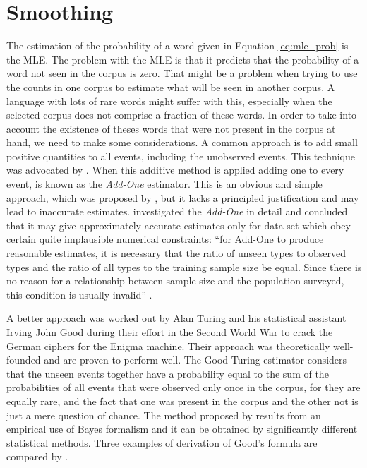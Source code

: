\section{Smoothing}
The estimation of the probability of a word given in Equation \ref{eq:mle_prob} is the MLE.
The problem with the MLE is that it predicts that the probability of a word not seen in the corpus
is zero. That might be a problem when trying to use the counts in one corpus to estimate what will
be seen in another corpus. A language with lots of rare words might suffer with this, especially
when the selected corpus does not comprise a fraction of these words. In order to take into account 
the existence of theses words that were not present in the corpus at hand, we need to make some 
considerations. 
A common approach is to add small positive quantities to all events, including the unobserved events. 
This technique was advocated by \cite{Lidstone1920, Johnson1932,jeffreys1939theory}.
When this additive method is applied adding one to every event, is known as the \textit{Add-One} estimator.
This is an obvious and simple approach, which was proposed by \cite{laplace}, 
but it lacks a principled justification and may lead to
inaccurate estimates.
\cite{Gale94} investigated the \textit{Add-One} in detail and concluded that it may give approximately
accurate estimates only for data-set which obey certain quite implausible numerical constraints:
``for Add-One to produce reasonable estimates, it is necessary that the ratio of unseen types to
observed types and the ratio of all types to the training sample size be equal. Since there is no reason for a
relationship between sample size and the population surveyed, this condition is usually invalid'' \citep{Gale94}.


A better approach was worked out by Alan Turing and his statistical assistant 
Irving John Good during their effort in the Second World War to crack the German ciphers for the Enigma machine.
Their approach was theoretically well-founded and are proven to perform well.
The Good-Turing estimator \citep{Good1953} considers that the unseen events
together have a probability equal to the sum of the probabilities of all events that were observed
only once in the corpus, for they are equally rare, and the fact that one was present in the corpus
and the other not is just a mere question of chance.
The method proposed by \cite{Good1953} results from an empirical use of Bayes formalism
and it can be obtained by significantly different statistical methods. Three examples of derivation
of Good's formula are compared by \cite{nadas1985}.


